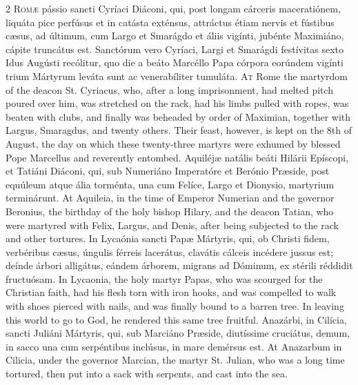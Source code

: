 \begin{paracol}{2}
\lettrine[lines=2]{R}{omæ} pássio sancti Cyríaci Diáconi, qui, post 
 longam cárceris maceratiónem, liquáta pice perfúsus et in catásta exténsus, 
 attráctus étiam nervis et fústibus cæsus, ad últimum, cum Largo et Smarágdo 
 et áliis vigínti, jubénte Maximiáno, cápite truncátus est. Sanctórum 
 vero Cyríaci, Largi et Smarágdi festívitas sexto Idus Augústi recólitur, quo 
 die a beáto Marcéllo Papa córpora eorúndem vigínti trium Mártyrum leváta 
 sunt ac venerabíliter tumuláta.
\switchcolumn
{}
\lettrine[lines=2]{A}{t} Rome the martyrdom of the deacon St. Cyriacus, who, after a long 
 imprisonment, had melted pitch poured over him, was stretched on the rack, 
 had his limbs pulled with ropes, was beaten with clubs, and finally was 
 beheaded by order of Maximian, together with Largus, Smaragdus, and twenty 
 others. Their feast, however, is kept on the 8th of August, the day on 
 which these twenty-three martyrs were exhumed by blessed Pope Marcellus and 
 reverently entombed.
\switchcolumn*
{}
Aquiléjæ natális beáti Hilárii Epíscopi, et 
 Tatiáni Diáconi, qui, sub Numeriáno Imperatóre et Berónio Præside, post 
 equúleum atque ália torménta, una cum Felíce, Largo et Dionysio, martyrium 
 terminárunt.
\switchcolumn
{}
At Aquileia, in the time of Emperor Numerian and the governor Beronius, the 
 birthday of the holy bishop Hilary, and the deacon Tatian, who were martyred 
 with Felix, Largus, and Denis, after being subjected to the rack and other 
 tortures.
\switchcolumn*
{}
In Lycaónia sancti Papæ Mártyris, qui, ob 
 Christi fidem, verbéribus cæsus, úngulis férreis lacerátus, clavátis cálceis 
 incédere jussus est; deínde árbori alligátus, eándem árborem, migrans ad 
 Dóminum, ex stérili réddidit fructuósam.
\switchcolumn
{}
In Lycaonia, the holy martyr Papas, who was scourged for the Christian 
 faith, had his flesh torn with iron hooks, and was compelled to walk with 
 shoes pierced with nails, and was finally bound to a barren tree. In 
 leaving this world to go to God, he rendered this same tree fruitful.
\switchcolumn*
{}
Anazárbi, in Cilícia, sancti Juliáni Mártyris, qui, sub Marciáno Præside, 
 diutíssime cruciátus, demum, in sacco una cum serpéntibus inclúsus, in mare 
 demérsus est.
\switchcolumn
{}
At Anazarbum in Cilicia, under the governor Marcian, the martyr St. Julian, 
 who was a long time tortured, then put into a sack with serpents, and cast 
 into the sea.
\switchcolumn*


\end{paracol}
